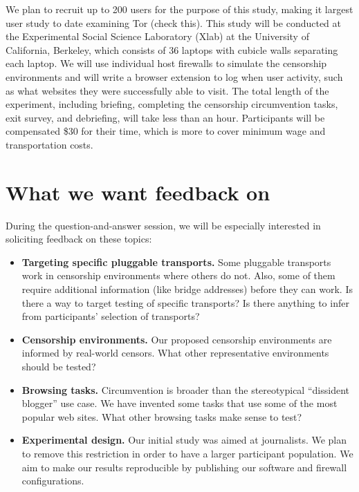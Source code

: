 \documentclass{sig-alternate-hotpets15}
\begin{document}

We plan to recruit up to 200 users for the purpose of this study, 
making it largest user study to date examining Tor (check this). 
This study will be conducted at the Experimental Social Science Laboratory (Xlab)
at the University of California, Berkeley, which consists of 36 laptops with 
cubicle walls separating each laptop. We will use individual host firewalls to simulate
the censorship environments and will write a browser extension to 
log when user activity, such as what websites they were successfully able to visit. 
The total length of the experiment, including briefing, completing the censorship 
circumvention tasks, exit survey, and debriefing, will take less than an hour. 
Participants will be compensated \$30 for their time, 
which is more to cover minimum wage and transportation costs.  \\

\section{What we want feedback on}

During the question-and-answer session,
we will be especially interested in soliciting feedback
on these topics:

\begin{itemize} \itemsep1pt \parskip0pt 
\item {\bfseries Targeting specific pluggable transports.}
Some pluggable transports work in censorship environments
where others do not.
Also, some of them require additional information
(like bridge addresses) before they can work.
Is there a way to target testing of specific transports?
Is there anything to infer from participants' selection of transports?

\item {\bfseries Censorship environments.}
Our proposed censorship environments are informed
by real-world censors.
What other representative environments
should be tested?

\item {\bfseries Browsing tasks.}
Circumvention is broader than the stereotypical
``dissident blogger'' use case.
We have invented some tasks that use some of the
most popular web sites.
What other browsing tasks make sense to test?

\item {\bfseries Experimental design.}
Our initial study was aimed at journalists.
We plan to remove this restriction in order
to have a larger participant population.
We aim to make our results reproducible by publishing
our software and firewall configurations.
\end{itemize}
\end{document}
